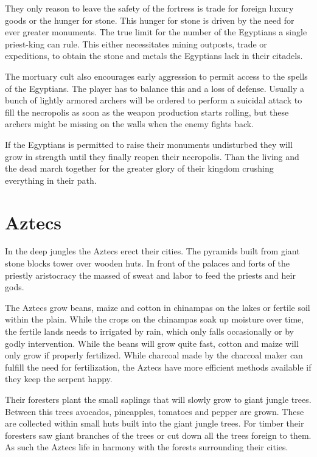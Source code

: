 \documentclass[a4paper]{book}
\begin{document}
		They only reason to leave the safety of the fortress is trade for foreign luxury
		goods or the hunger for stone.
		This hunger for stone is driven by the need for ever greater monuments.
		The true limit for the number of the \gls{Egyptians} a single priest-king
		can rule.
		This either necessitates mining outposts, trade or expeditions,
		to obtain the stone and metals the \gls{Egyptians} lack in their citadels.

		The mortuary cult also encourages early aggression to permit access to the
		spells of the \gls{Egyptians}.
		The player has to balance this and a loss of defense.
		Usually a bunch of lightly armored archers will be ordered to perform
		a suicidal attack to fill the necropolis as soon as the weapon production
		starts rolling,
		but these archers might be missing on the walls when the enemy fights back.

		If the \gls{Egyptians} is permitted to raise their monuments undisturbed
		they will grow in strength until they finally reopen their necropolis.
		Than the living and the dead march together for the greater glory
		of their kingdom crushing everything in their path.

\section{\Gls{Aztecs}}

	In the deep jungles the \gls{Aztecs} erect their cities.
	The pyramids built from giant stone blocks tower over wooden huts.
	In front of the palaces and forts of the priestly aristocracy the massed of sweat 
	and labor to feed the priests and heir gods.

	The \gls{Aztecs} grow beans, maize and cotton in chinampas on the lakes or fertile soil within the plain.
	While the crops on the chinampas soak up moisture over time,
	the fertile lands needs to irrigated by rain, which only falls occasionally or by godly intervention.
	While the beans will grow quite fast, cotton and maize will only grow if properly fertilized.
	While charcoal made by the charcoal maker can fulfill the need for fertilization,
	the \gls{Aztecs} have more efficient methods available if they keep the serpent happy.

	Their foresters plant the small saplings that will slowly grow to giant jungle trees.
	Between this trees avocados, pineapples, tomatoes and pepper are grown.
	These are collected within small huts built into the giant jungle trees.
	For timber their foresters saw giant branches of the trees or cut down all the trees foreign to them.
	As such the \gls{Aztecs} life in harmony with the forests surrounding their cities.
\end{document}
